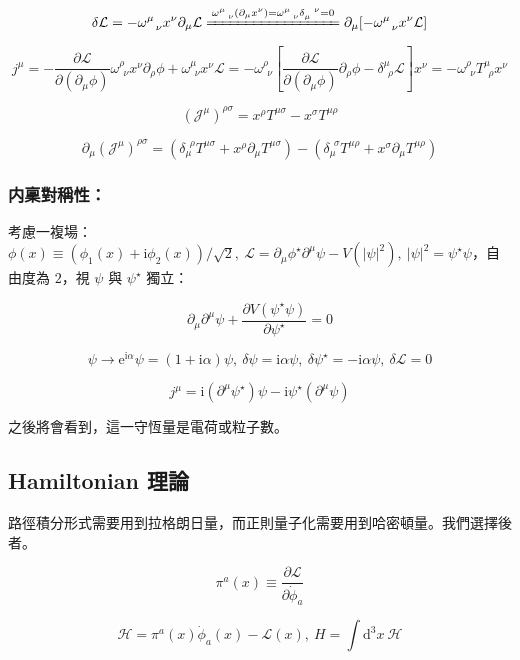 \documentclass{article}
\begin{document}
$$\delta\mathcal{L}=-\omega^{\mu}_{\ \ \nu}x^{\nu}\partial_{\mu}\mathcal{L}\xlongequal{\omega^{\mu}_{\ \ \nu}(\partial_{\mu}x^{\nu})=\omega^{\mu}_{\ \ \nu}\delta_{\mu}^{\ \ \nu}=0}\partial_{\mu}[-\omega^{\mu}_{\ \ \nu}x^{\nu}\mathcal{L}]$$

$$j^{\mu}=-\frac{\partial\mathcal{L}}{\partial(\partial_{\mu}\phi)}\omega^{\rho}_{\ \ \nu}x^{\nu}\partial_{\rho}\phi+\omega^{\mu}_{\ \ \nu}x^{\nu}\mathcal{L}=-\omega^{\rho}_{\ \ \nu}[\frac{\partial\mathcal{L}}{\partial(\partial_{\mu}\phi)}\partial_{\rho}\phi-\delta^{\mu}_{\ \ \rho}\mathcal{L}]x^{\nu}=-\omega^{\rho}_{\ \ \nu}T^{\mu}_{\ \ \rho}x^{\nu}$$

$$(\mathcal{J^{\mu}})^{\rho\sigma}=x^{\rho}T^{\mu\sigma}-x^{\sigma}T^{\mu\rho}$$

$$\partial_{\mu}(\mathcal{J^{\mu}})^{\rho\sigma}=(\delta_{\mu}^{\ \ \rho}T^{\mu\sigma}+x^{\rho}\partial_{\mu}T^{\mu\sigma})-(\delta_{\mu}^{\ \ \sigma}T^{\mu\rho}+x^{\sigma}\partial_{\mu}T^{\mu\rho})$$

\subsubsection{内稟對稱性：}

考慮一複場：$\phi(x)\equiv(\phi_1(x)+\mathrm{i}\phi_2(x))/\sqrt{2},\ \mathcal{L}=\partial_{\mu}\phi^{\star}\partial^{\mu}\psi-V(|\psi|^2),\ |\psi|^2=\psi^{\star}\psi$，自由度為 $2$，視 $\psi$ 與 $\psi^{\star}$ 獨立：

$$\partial_{\mu}\partial^{\mu}\psi+\frac{\partial V(\psi^{\star}\psi)}{\partial\psi^{\star}}=0$$

$$\psi\to\mathrm{e}^{\mathrm{i}\alpha}\psi=(1+\mathrm{i}\alpha)\psi,\ \delta\psi=\mathrm{i}\alpha\psi,\ \delta\psi^{\star}=-\mathrm{i}\alpha\psi,\ \delta\mathcal{L}=0$$

$$j^{\mu}=\mathrm{i}(\partial^{\mu}\psi^{\star})\psi-\mathrm{i}\psi^{\star}(\partial^{\mu}\psi)$$

之後將會看到，這一守恆量是電荷或粒子數。

\subsection{Hamiltonian 理論}

路徑積分形式需要用到拉格朗日量，而正則量子化需要用到哈密頓量。我們選擇後者。

$$\pi^{a}(x)\equiv\frac{\partial\mathcal{L}}{\partial\dot{\phi}_a}$$

$$\mathcal{H}=\pi^a(x)\dot{\phi}_{a}(x)-\mathcal{L}(x),\ H=\int\mathrm{d}^3x\ \mathcal{H}$$
\end{document}
